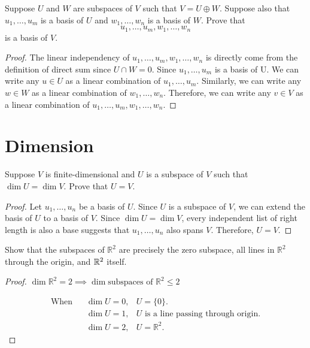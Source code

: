 \begin{exercise}
Suppose $U$ and $W$ are subspaces of $V$ such that \(V = U \oplus W\).
Suppose also that \(u_{1},\dots,u_{m}\) is a basis of $U$ and \(w_{1},\dots,w_{n}\)
is a basis of $W$. Prove that \[u_{1},\dots,u_{m}, w_{1},\dots,w_{n}\]
is a basis of $V$.
\end{exercise}
\begin{proof}
	The linear independency of \(u_{1},\dots,u_{m}, w_{1},\dots,w_{n}\) is directly come from the definition of direct sum since \(U \cap W = {0}\).
	Since \(u_{1}, \dots, u_{m}\) is a basis of U. We can write any \(u \in U\) as a linear combination of \(u_{1}, \dots, u_{m}\). Similarly, we can write any \(w \in W\) as a linear combination of \(w_{1}, \dots, w_{n}\).
	Therefore, we can write any \(v \in V\) as a linear combination of \(u_{1}, \dots, u_{m}, w_{1}, \dots, w_{n}\).
\end{proof}

\section{Dimension}

\begin{exercise}
Suppose $V$ is finite-dimensional and $U$ is a subspace of $V$ such that $ \dim U = \dim V$. Prove that $U = V$.
\end{exercise}

\begin{proof}
	Let \(u_1, \dots, u_n\) be a basis of $U$. Since $U$ is a subspace of $V$, we can extend the basis of $U$ to a basis of $V$.
	Since \( \dim U = \dim V\), every independent list of right length is also a base suggests that \(u_{1}, \dots, u_{n}\) also spans $V$. Therefore, \(U = V\).
\end{proof}

\begin{exercise}
Show that the subspaces of $\mathbb{R}^2$ are precisely the zero subspace, all lines in $\mathbb{R}^{2}$ through the origin, and $\mathbb{R}^2$ itself.
\end{exercise}
\begin{proof}
	\( \dim \mathbb{R}^{2} = 2 \implies \dim \text{subspaces of } \mathbb{R}^{2} \leq 2\)

	\begin{align}
		\text{When} \hspace{10pt} & \dim U = 0, & U = \{0\}.                               \\
		                          & \dim U = 1, & U \text{ is a line passing through origin.} \\
		                          & \dim U = 2, & U = \mathbb{R}^{2}.
	\end{align}



\end{proof}


